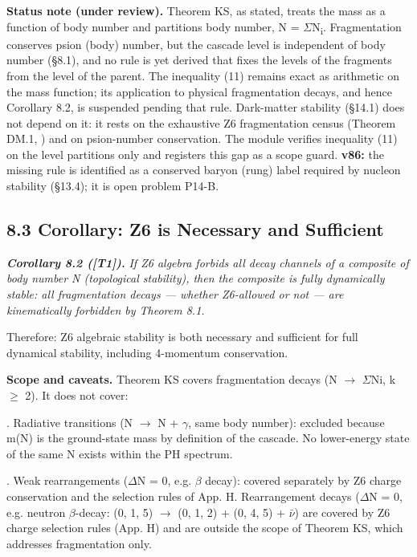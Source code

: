 \documentclass[11pt,letterpaper]{article}
\begin{document}
\noindent \textbf{Status note (under review).} Theorem KS, as stated, treats the mass as a function of body number and partitions body number, N = $\Sigma$N\textsubscript{i}. Fragmentation conserves psion (body) number, but the cascade level is independent of body number (§8.1), and no rule is yet derived that fixes the levels of the fragments from the level of the parent. The inequality (11) remains exact as arithmetic on the mass function; its application to physical fragmentation decays, and hence Corollary 8.2, is suspended pending that rule. Dark-matter stability (§14.1) does not depend on it: it rests on the exhaustive Z6 fragmentation census (Theorem DM.1, ) and on psion-number conservation. The module  verifies inequality (11) on the level partitions only and registers this gap as a scope guard. \textbf{v86:} the missing rule is identified as a conserved baryon (rung) label required by nucleon stability (§13.4); it is open problem P14-B.

\subsection*{8.3  Corollary: Z6 is Necessary and Sufficient}

\noindent \textbf{\textit{Corollary 8.2 ([T1]). }}\textit{If Z6 algebra forbids all decay channels of a composite of body number N (topological stability), then the composite is fully dynamically stable: all fragmentation decays --- whether Z6-allowed or not --- are kinematically forbidden by Theorem 8.1.}

\noindent Therefore: Z6 algebraic stability is both necessary and sufficient for full dynamical stability, including 4-momentum conservation.

\noindent \textbf{Scope and caveats. }Theorem KS covers fragmentation decays (N $\to$ $\Sigma$Ni, k $\ge$ 2). It does not cover:

. Radiative transitions (N $\to$ N + $\gamma$, same body number): excluded because m(N) is the ground-state mass by definition of the cascade. No lower-energy state of the same N exists within the PH spectrum.

. Weak rearrangements ($\Delta$N = 0, e.g. $\beta$ decay): covered separately by Z6 charge conservation and the selection rules of App. H. Rearrangement decays ($\Delta$N = 0, e.g. neutron $\beta$-decay: (0, 1, 5) $\to$ (0, 1, 2) + (0, 4, 5) + $\bar{\nu}$) are covered by Z6 charge selection rules (App. H) and are outside the scope of Theorem KS, which addresses fragmentation only.
\end{document}
